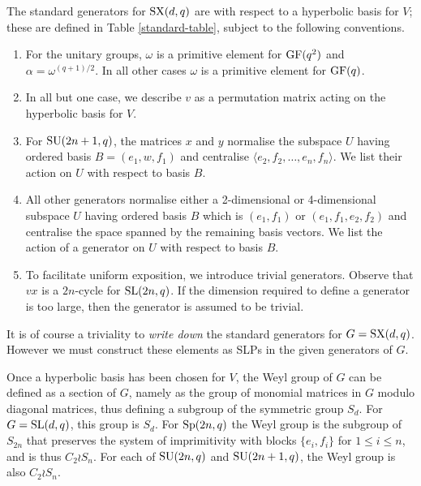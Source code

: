 \documentclass[12pt]{article}
\def\SL{{\rm SL}}
\def\GF{{\rm GF}}
\def\Sp{{\rm Sp}}
\def\SU{{\rm SU}}
\def\SX{{\rm SX}}
\begin{document}
The standard generators for $\SX (d, q)$ are with respect
to a hyperbolic basis for $V$; these  are defined
in Table \ref{standard-table}, subject to the following conventions.
\begin{enumerate}
\item 
For the unitary groups, $\omega$ is a primitive element for $\GF(q^2)$
and $\alpha = \omega^{(q + 1)/2}$. 
In all other cases $\omega$ is a primitive element for $\GF(q)$.


\item In all but one case, we describe $v$
as a permutation matrix acting on the 
hyperbolic basis for $V$.

\item For $\SU(2n+1, q)$, the matrices $x$ and $y$
normalise the subspace $U$ having ordered basis $B = (e_1,w,f_1)$ and
centralise $\langle e_2, f_2, \ldots, e_{n}, f_{n}\rangle$.
We list their action on $U$ with respect to basis $B$.

\item 
All other generators 
normalise either a 2-dimensional or 4-dimensional subspace $U$ 
having ordered basis $B$ which is $(e_1, f_1)$ or $(e_1, f_1, e_2, f_2)$
and centralise the space spanned by the remaining basis vectors.
We list the action of a generator on $U$ with respect to basis $B$.

\item 
To facilitate uniform exposition, we introduce trivial generators. 
Observe that $vx$ is a $2n$-cycle for $\SL(2n, q)$. 
If the dimension required to define a generator is too large, 
then the generator is assumed to be trivial.
\end{enumerate}

It is of course a triviality to  {\it write down} the standard generators
for $G=\SX(d, q)$.  However we must construct these elements
as SLPs in the given generators of $G$.

Once a hyperbolic basis has been chosen for $V$, the Weyl group of $G$
can be defined as a section of $G$, namely as the group of monomial 
matrices in $G$ modulo diagonal
matrices, thus defining a subgroup of the symmetric group $S_d$. For
$G=\SL(d,q)$, this group is $S_d$. For $\Sp(2n,q)$ the Weyl group 
is the subgroup of $S_{2n}$ that preserves the system of imprimitivity 
with blocks
$\{e_i,f_i\}$ for $1\le i\le n$, and is thus $C_2\wr S_n$. For
each of $\SU(2n,q)$ and $\SU(2n+1,q)$, the Weyl group is also $C_2\wr S_n$. 
\end{document}
